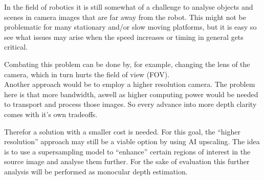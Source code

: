 In the field of robotics it is still somewhat of a challenge to analyse objects and scenes in camera images that are far away from the robot.
This might not be problematic for many stationary and/or slow moving platforms, but it is easy so see what issues may arise when the speed increases or timing in general gets critical.

Combating this problem can be done by, for example, changing the lens of the camera, which in turn hurts the field of view (FOV). \\
Another approach would be to employ a higher resolution camera. The problem here is that more bandwidth, aswell as higher computing power would be needed to transport and process those images.
So every advance into more depth clarity comes with it's own tradeoffs.

Therefor a solution with a smaller cost is needed. For this goal, the \enquote{higher resolution} approach may still be a viable option by using AI upscaling.
The idea is to use a supersampling model to \enquote{enhance} certain regions of interest in the source image and analyse them further.
For the sake of evaluation this further analysis will be performed as monocular depth estimation.
